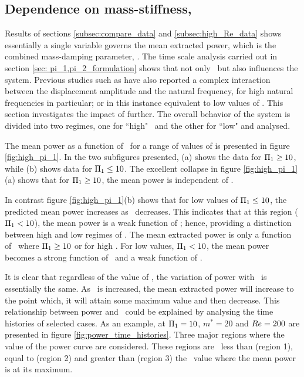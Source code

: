\subsection{Dependence on mass-stiffness, \massstiff}
\label{subsec:dependence pi_1}



Results of sections \ref{subsec:compare_data} and \ref{subsec:high_Re_data} shows essentially a single variable governs the mean extracted power, which is the combined mass-damping parameter, \massdamp. The time scale analysis carried out in  section \ref{sec: pi_1,pi_2_formulation} shows that not only \massdamp \ but also \massstiff influences the system. Previous studies such as \cite{bouclin:77} have also reported a complex interaction between the displacement amplitude and the natural frequency, for high natural frequencies in particular; or in this instance equivalent to low values of \massstiff.  This section investigates the impact of \massstiff further. The overall behavior of the system is divided into two regimes, one for ``high" \massstiff \ and the other for ``low" \massstiff and analysed.

The mean power as a function of \massdamp \ for a range of values of \massstiff is presented in figure \ref{fig:high_pi_1}. In the two subfigures presented, (a) shows the data for $\Pi_1 \geq 10$, while (b) shows data for $\Pi_1 \leq 10$.  The excellent collapse in figure \ref{fig:high_pi_1}(a) shows that for $\Pi_1 \geq 10$, the mean power is independent of \massstiff.

In contrast figure \ref{fig:high_pi_1}(b) shows that for low values of $\Pi_1 \leq 10$, the predicted mean power increases as \massdamp \ decreases. This indicates that at this region ($\Pi_1 < 10$), the mean power is a weak function of \massstiff; hence, providing a distinction between high and low regimes of \massstiff. The mean extracted power is only a function of \massdamp \ where $\Pi_1 \geq 10$ or for high \massstiff. For low values, $\Pi_1 < 10$, the mean power becomes a strong function of \massdamp \ and a weak function of \massstiff.

It is clear that regardless of the value of \massstiff, the variation of power with \massdamp \ is essentially the same. As \massdamp \ is increased, the mean extracted power will increase to the point which, it will attain some maximum value and then decrease. This relationship between power and \massdamp \ could be explained by analysing the time histories of selected cases. 
As an example, at $\Pi_1=10$, $m^*=20$ and $Re=200$ are presented in figure \ref{fig:power_time_histories}. Three major regions where the value of the power curve are considered. These regions are \massdamp\ less than (region 1), equal to (region 2) and greater than (region 3) the \massdamp\ value where the mean power is at its maximum.

